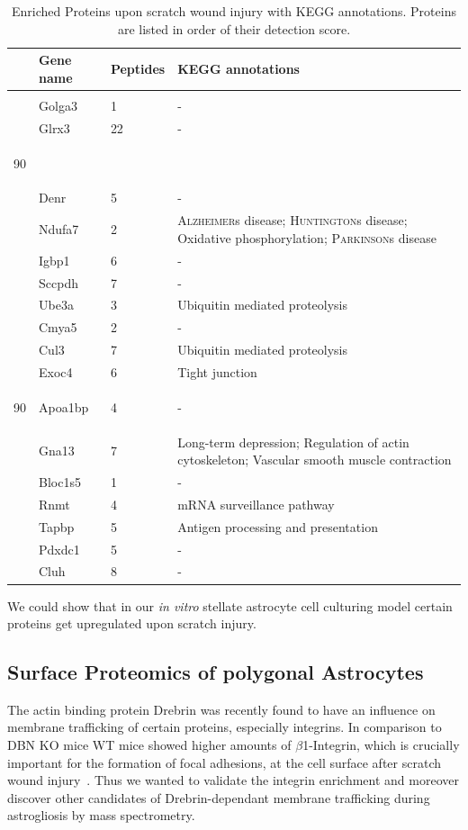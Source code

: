 \documentclass[a4paper,11pt,bibtotocnumbered]{article}
\newcommand\tabrotate[1]{\begin{turn}{90}\rlap{#1}\end{turn}} %
\begin{document}
\begin{table}[H]
\centering
\caption[Enriched Proteins in reactive stellate Astrocytes.]{Enriched Proteins upon scratch wound injury with KEGG annotations. Proteins are listed in order of their detection score.}\label{Stelltable}
\renewcommand{\arraystretch}{.8}
\begin{tabularx}{\textwidth}{p{.5cm}p{2cm}Xp{9cm}}
\toprule
&Gene name& Peptides & KEGG annotations \\ 
\midrule
&&&\\
&Golga3&1&-\\
&Glrx3&22&-\\
\tabrotate{Unscratched}&&&\\
\midrule
&Denr&5&-\\
&Ndufa7&2& \textsc{Alzheimer}s disease; \textsc{Huntington}s disease; Oxidative phosphorylation; \textsc{Parkinson}s disease\\
&Igbp1&6&-\\
&Sccpdh&7&-\\
&Ube3a&3&Ubiquitin mediated proteolysis\\
&Cmya5&2&-\\
&Cul3&7&Ubiquitin mediated proteolysis\\
&Exoc4&6&Tight junction\\
\tabrotate{Scratched}&Apoa1bp&4&-\\
&Gna13&7&Long-term depression; Regulation of actin cytoskeleton; Vascular smooth muscle contraction\\
&Bloc1s5&1&-\\
&Rnmt&4&mRNA surveillance pathway\\
&Tapbp&5&Antigen processing and presentation\\
&Pdxdc1&5&-\\
&Cluh&8&-\\
\bottomrule
\end{tabularx}
\end{table}


We could show that in our \textit{in vitro} stellate astrocyte cell culturing model certain proteins get upregulated upon scratch injury.  


\subsection{Surface Proteomics of polygonal Astrocytes}

The actin binding protein Drebrin was recently found to have an influence on membrane trafficking of certain proteins, especially integrins. In comparison to DBN KO mice WT mice showed higher amounts of $\beta$1-Integrin, which is crucially important for the formation of focal adhesions, at the cell surface after scratch wound injury~\cite{Schiweck2020}. Thus we wanted to validate the integrin enrichment and moreover discover other candidates of Drebrin-dependant membrane trafficking during astrogliosis by mass spectrometry. 
\end{document}
